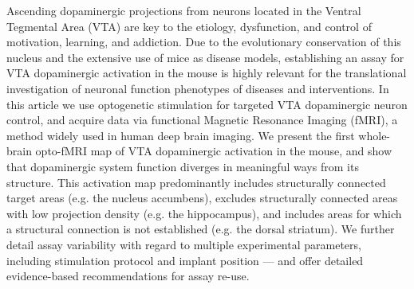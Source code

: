 Ascending dopaminergic projections from neurons located in the Ventral Tegmental Area (VTA) are key to the etiology, dysfunction, and control of motivation, learning, and addiction.
Due to the evolutionary conservation of this nucleus and the extensive use of mice as disease models, establishing an assay for VTA dopaminergic activation in the mouse is highly relevant for the translational investigation of neuronal function phenotypes of diseases and interventions.
In this article we use optogenetic stimulation for targeted VTA dopaminergic neuron control, and acquire data via functional Magnetic Resonance Imaging (fMRI), a method widely used in human deep brain imaging.
We present the first whole-brain opto-fMRI map of VTA dopaminergic activation in the mouse, and show that dopaminergic system function diverges in meaningful ways from its structure.
This activation map predominantly includes structurally connected target areas (e.g. the nucleus accumbens), excludes structurally connected areas with low projection density (e.g. the hippocampus), and includes areas for which a structural connection is not established (e.g. the dorsal striatum).
We further detail assay variability with regard to multiple experimental parameters, including stimulation protocol and implant position --- and offer detailed evidence-based recommendations for assay re-use.
